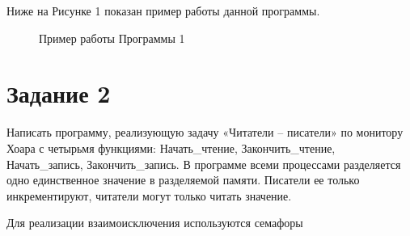 \documentclass[14pt, a4paper]{extarticle}
\begin{document}
	\newpage
	Ниже на Рисунке 1 показан пример работы данной программы.
	\begin{figure}[h!]
		\caption{Пример работы Программы 1}
	\end{figure}
	\newpage
	
	\section*{Задание 2}
	Написать программу, реализующую задачу «Читатели – писатели» по монитору Хоара с четырьмя функциями: Начать\_чтение, Закончить\_чтение, Начать\_запись, Закончить\_запись. В программе всеми процессами разделяется одно единственное значение в разделяемой памяти. Писатели ее только инкрементируют, читатели могут только читать значение.\par
	Для реализации взаимоисключения используются семафоры\par 	
	
\end{document}
